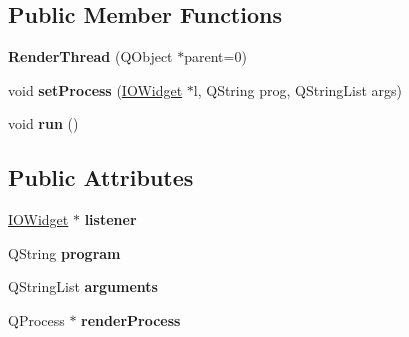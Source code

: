 \subsection*{\-Public \-Member \-Functions}
\begin{DoxyCompactItemize}
\item 
\hypertarget{class_render_thread_a5738e490ba780da025dfa52bfe030200}{
{\bfseries \-Render\-Thread} (\-Q\-Object $\ast$parent=0)}
\label{class_render_thread_a5738e490ba780da025dfa52bfe030200}

\item 
\hypertarget{class_render_thread_a384fd112c98f3bfec7f8f95811d49b13}{
void {\bfseries set\-Process} (\hyperlink{class_i_o_widget}{\-I\-O\-Widget} $\ast$l, \-Q\-String prog, \-Q\-String\-List args)}
\label{class_render_thread_a384fd112c98f3bfec7f8f95811d49b13}

\item 
\hypertarget{class_render_thread_a43602ff1f6ddfad531eb27e4e9ebd945}{
void {\bfseries run} ()}
\label{class_render_thread_a43602ff1f6ddfad531eb27e4e9ebd945}

\end{DoxyCompactItemize}
\subsection*{\-Public \-Attributes}
\begin{DoxyCompactItemize}
\item 
\hypertarget{class_render_thread_afc1ba45ace5c74714122e419e2865f90}{
\hyperlink{class_i_o_widget}{\-I\-O\-Widget} $\ast$ {\bfseries listener}}
\label{class_render_thread_afc1ba45ace5c74714122e419e2865f90}

\item 
\hypertarget{class_render_thread_a419ae6df0875e3084a0cee613665aa58}{
\-Q\-String {\bfseries program}}
\label{class_render_thread_a419ae6df0875e3084a0cee613665aa58}

\item 
\hypertarget{class_render_thread_a5bea8274f96ce80e89541bace678a60c}{
\-Q\-String\-List {\bfseries arguments}}
\label{class_render_thread_a5bea8274f96ce80e89541bace678a60c}

\item 
\hypertarget{class_render_thread_a9eb18732d5ef16489b313e802e9c7866}{
\-Q\-Process $\ast$ {\bfseries render\-Process}}
\label{class_render_thread_a9eb18732d5ef16489b313e802e9c7866}

\end{DoxyCompactItemize}

